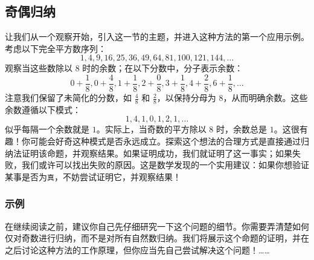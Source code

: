 \subsection{奇偶归纳}

让我们从一个观察开始，引入这一节的主题，并进入这种方法的第一个应用示例。考虑以下完全平方数序列：
\[1, 4, 9, 16, 25, 36, 49, 64, 81, 100, 121, 144, \dots\]
观察当这些数除以 $8$ 时的余数；在以下分数中，分子表示余数：
\[0+\frac{1}{8}, 0+\frac{4}{8}, 1+\frac{1}{8}, 2+\frac{0}{8}, 3+\frac{1}{8}, 4+\frac{2}{8}, 6+\frac{1}{8},  \dots\]
注意我们保留了未简化的分数，如 $\frac{4}{8}$ 和 $\frac{2}{8}$，以保持分母为 $8$，从而明确余数。这些余数遵循以下模式：
\[1, 4, 1, 0, 1, 2, 1, \dots\]
似乎每隔一个余数就是 $1$。实际上，当奇数的平方除以 $8$ 时，余数总是 $1$。这很有趣！你可能会好奇这种模式是否永远成立。探索这个想法的合理方式是直接通过归纳法证明该命题，并观察结果。如果证明成功，我们就证明了这一事实；如果失败，我们或许可以找出失败的原因。这是数学发现的一个实用建议：如果你想验证某事是否为\verb|真|，不妨尝试证明它，并观察结果！

\subsubsection*{示例}

在继续阅读之前，建议你自己先仔细研究一下这个问题的细节。你需要弄清楚如何仅对奇数进行归纳，而不是对所有自然数归纳。我们将展示这个命题的证明，并在之后讨论这种方法的工作原理，但你应当先自己尝试解决这个问题！……\\

